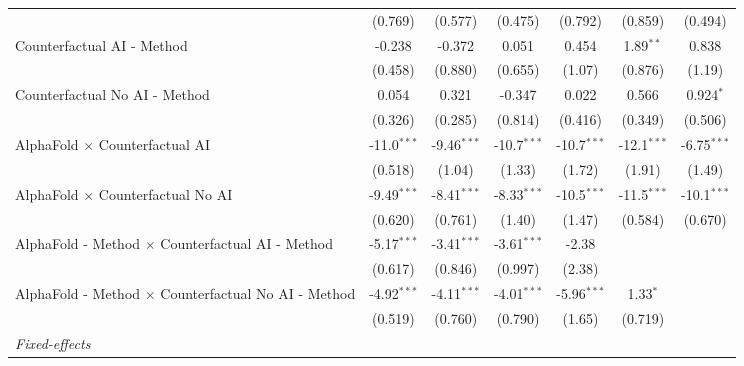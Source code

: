 \begin{tabular}{lcccccc}
                                                              & (0.769)       & (0.577)       & (0.475)       & (0.792)       & (0.859)       & (0.494)\\   
   Counterfactual AI - Method                                 & -0.238        & -0.372        & 0.051         & 0.454         & 1.89$^{**}$   & 0.838\\   
                                                              & (0.458)       & (0.880)       & (0.655)       & (1.07)        & (0.876)       & (1.19)\\   
   Counterfactual No AI - Method                              & 0.054         & 0.321         & -0.347        & 0.022         & 0.566         & 0.924$^{*}$\\   
                                                              & (0.326)       & (0.285)       & (0.814)       & (0.416)       & (0.349)       & (0.506)\\   
   AlphaFold $\times$ Counterfactual AI                       & -11.0$^{***}$ & -9.46$^{***}$ & -10.7$^{***}$ & -10.7$^{***}$ & -12.1$^{***}$ & -6.75$^{***}$\\   
                                                              & (0.518)       & (1.04)        & (1.33)        & (1.72)        & (1.91)        & (1.49)\\   
   AlphaFold $\times$ Counterfactual No AI                    & -9.49$^{***}$ & -8.41$^{***}$ & -8.33$^{***}$ & -10.5$^{***}$ & -11.5$^{***}$ & -10.1$^{***}$\\   
                                                              & (0.620)       & (0.761)       & (1.40)        & (1.47)        & (0.584)       & (0.670)\\   
   AlphaFold - Method $\times$ Counterfactual AI - Method     & -5.17$^{***}$ & -3.41$^{***}$ & -3.61$^{***}$ & -2.38         &               &   \\   
                                                              & (0.617)       & (0.846)       & (0.997)       & (2.38)        &               &   \\   
   AlphaFold - Method $\times$ Counterfactual No AI - Method  & -4.92$^{***}$ & -4.11$^{***}$ & -4.01$^{***}$ & -5.96$^{***}$ & 1.33$^{*}$    &   \\   
                                                              & (0.519)       & (0.760)       & (0.790)       & (1.65)        & (0.719)       &   \\   
   \midrule
   \emph{Fixed-effects}\\

\end{tabular}
